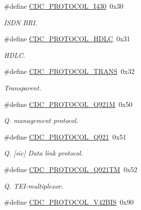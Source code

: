 \begin{DoxyCompactItemize}
\item 
\#define \hyperlink{group__cdc__protocol__group_ga34f6a52b0c21cc0df8558a89ab6244aa}{\-C\-D\-C\-\_\-\-P\-R\-O\-T\-O\-C\-O\-L\-\_\-\-I430}~0x30
\begin{DoxyCompactList}\small\item\em \-I\-S\-D\-N \-B\-R\-I. \end{DoxyCompactList}\item 
\#define \hyperlink{group__cdc__protocol__group_gaf4adc6afe3a8d15272d6063942fe1b1d}{\-C\-D\-C\-\_\-\-P\-R\-O\-T\-O\-C\-O\-L\-\_\-\-H\-D\-L\-C}~0x31
\begin{DoxyCompactList}\small\item\em \-H\-D\-L\-C. \end{DoxyCompactList}\item 
\#define \hyperlink{group__cdc__protocol__group_ga23a4cfd8c12e8d75a57bda51845abc0a}{\-C\-D\-C\-\_\-\-P\-R\-O\-T\-O\-C\-O\-L\-\_\-\-T\-R\-A\-N\-S}~0x32
\begin{DoxyCompactList}\small\item\em \-Transparent. \end{DoxyCompactList}\item 
\#define \hyperlink{group__cdc__protocol__group_ga304da80f158210479728ae1158f48498}{\-C\-D\-C\-\_\-\-P\-R\-O\-T\-O\-C\-O\-L\-\_\-\-Q921\-M}~0x50
\begin{DoxyCompactList}\small\item\em \-Q. management protocol. \end{DoxyCompactList}\item 
\#define \hyperlink{group__cdc__protocol__group_gab4efd3c7d98b5d12bf01238259a50707}{\-C\-D\-C\-\_\-\-P\-R\-O\-T\-O\-C\-O\-L\-\_\-\-Q921}~0x51
\begin{DoxyCompactList}\small\item\em \-Q. \mbox{[}sic\mbox{]} \-Data link protocol. \end{DoxyCompactList}\item 
\#define \hyperlink{group__cdc__protocol__group_ga4a1fc0e0435a322372f24b797bdccbc6}{\-C\-D\-C\-\_\-\-P\-R\-O\-T\-O\-C\-O\-L\-\_\-\-Q921\-T\-M}~0x52
\begin{DoxyCompactList}\small\item\em \-Q. \-T\-E\-I-\/multiplexor. \end{DoxyCompactList}\item 
\#define \hyperlink{group__cdc__protocol__group_ga230095dec563e53ab1231c981ee9d05f}{\-C\-D\-C\-\_\-\-P\-R\-O\-T\-O\-C\-O\-L\-\_\-\-V42\-B\-I\-S}~0x90

\end{DoxyCompactItemize}
